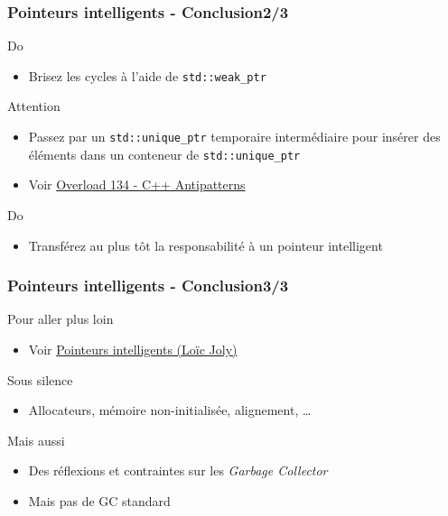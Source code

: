 \documentclass[C++.tex]{subfiles}
\begin{document}
\begin{frame}[fragile]
	\frametitle{Pointeurs intelligents - Conclusion\titlehfill{}2/3}
	\begin{exampleblock}{Do}
		\begin{itemize}
			\item Brisez les cycles à l'aide de \lstinline|std::weak_ptr|
		\end{itemize}
	\end{exampleblock}

	\begin{alertblock}{Attention}
		\begin{itemize}
			\item Passez par un \lstinline|std::unique_ptr| temporaire intermédiaire pour insérer des éléments dans un conteneur de \lstinline|std::unique_ptr|
			\item Voir \href{https://accu.org/index.php/journals/2271}{Overload 134 - C++ Antipatterns}
		\end{itemize}

	\end{alertblock}

	\begin{exampleblock}{Do}
		\begin{itemize}
			\item Transférez au plus tôt la responsabilité à un pointeur intelligent
		\end{itemize}
	\end{exampleblock}
\end{frame}

\begin{frame}[fragile]
	\frametitle{Pointeurs intelligents - Conclusion\titlehfill{}3/3}
	\begin{block}{Pour aller plus loin}
		\begin{itemize}
			\item Voir \href{http://loic-joly.developpez.com/tutoriels/cpp/smart-pointers/}{Pointeurs intelligents (Loïc Joly)}
		\end{itemize}
	\end{block}

	\begin{block}{Sous silence}
		\begin{itemize}
			\item Allocateurs, mémoire non-initialisée, alignement, \ldots
		\end{itemize} 
	\end{block}

	\begin{block}{Mais aussi}
	\begin{itemize}
		\item Des réflexions et contraintes sur les \textit{Garbage Collector}
		\item Mais pas de GC standard
	\end{itemize}
	\end{block}
\end{frame}
\end{document}
